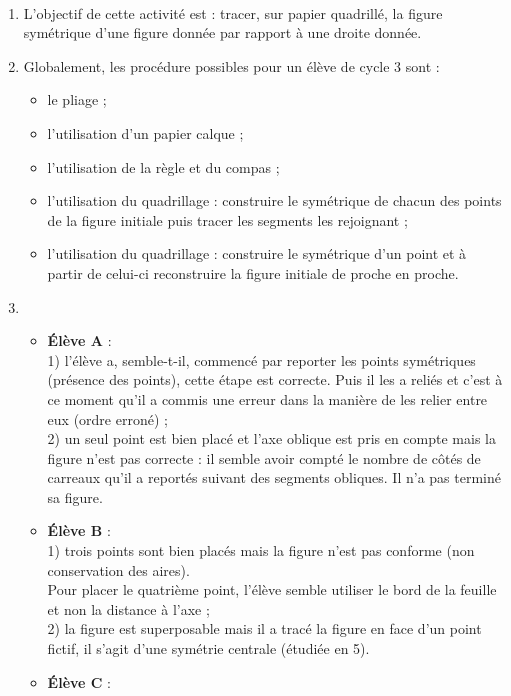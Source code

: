 \ \\ [-5mm]
\begin{enumerate}
   \item L'objectif de cette activité est : tracer, sur papier quadrillé, la figure symétrique d'une figure donnée par rapport à une droite donnée.
   \item Globalement, les procédure possibles pour un élève de cycle 3 sont :
   \begin{itemize}
      \item le pliage ;
      \item l'utilisation d'un papier calque ;
      \item l'utilisation de la règle et du compas ;
      \item l'utilisation du quadrillage : construire le symétrique de chacun des points de la figure initiale puis tracer les segments les rejoignant ;
      \item l'utilisation du quadrillage : construire le symétrique d'un point et à partir de celui-ci reconstruire la figure initiale de proche en proche.
\end{itemize}
    \item
    \begin{itemize}
       \item {\bf Élève A} : \\
       1) l'élève a, semble-t-il, commencé par reporter les points symétriques (présence des points), cette étape est correcte. Puis il les a reliés et c'est à ce moment qu'il a commis une erreur dans la manière de les relier entre eux (ordre erroné) ; \\
       2) un seul point est bien placé et l'axe oblique est pris en compte mais la figure n'est pas correcte : il semble avoir compté le nombre de côtés de carreaux qu'il a reportés suivant des segments obliques. Il n'a pas terminé sa figure.
       \item {\bf Élève B} : \\
       1) trois points sont bien placés mais la figure n'est pas conforme (non conservation des aires). \\
       Pour placer le quatrième point, l'élève semble utiliser le bord de la feuille et non la distance à l'axe ; \\
       2) la figure est superposable mais il a tracé la figure \og en face \fg{} d'un point fictif, il s'agit d'une symétrie centrale (étudiée en 5).
       \item {\bf Élève C} : \\

\end{itemize}
\end{enumerate}
